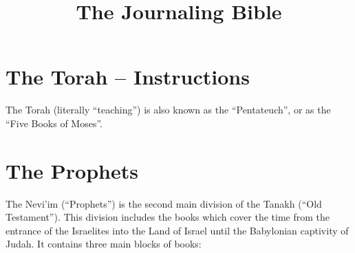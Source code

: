 \documentclass[std]{jbible}
\title{The Journaling Bible}
\begin{document}
\maketitle

\clearpage

\frontmatter
\tableofcontents{}



\mainmatter

\part{The Torah -- Instructions}

The Torah (literally ``teaching'') is also known as the ``Pentateuch'', or as the ``Five Books of Moses''.







\part{The Prophets}

The Nevi'im (``Prophets'') is the second main division of the Tanakh (``Old Testament''). This division includes the books which cover the time from the entrance of the Israelites into the Land of Israel until the Babylonian captivity of Judah. It contains three main blocks of books:
\end{document}
